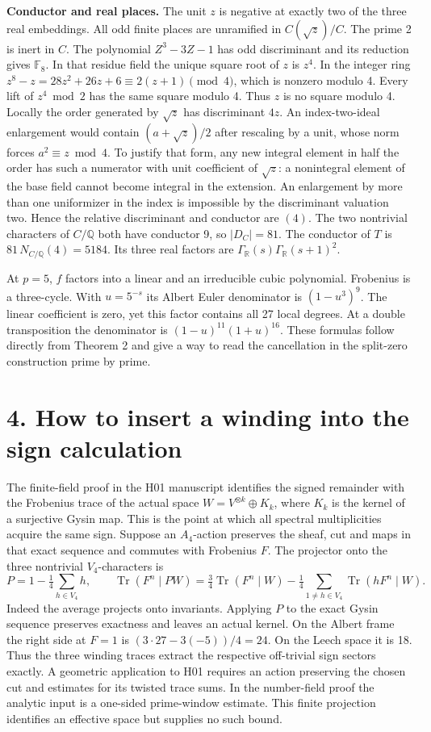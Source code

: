 \documentclass[11pt,a4paper]{article}
\newcommand{\Q}{\mathbb Q}
\newcommand{\Tr}{\operatorname{Tr}}
\begin{document}
\textbf{Conductor and real places.} The unit $z$ is negative at exactly two of the three real embeddings.
All odd finite places are unramified in $C(\sqrt z)/C$. The prime 2 is inert in $C$. The polynomial
$Z^3-3Z-1$ has odd discriminant and its reduction gives $\mathbb F_8$. In that residue field the unique square
root of $z$ is $z^4$. In the integer ring $z^8-z=28z^2+26z+6\equiv2(z+1)\pmod4$, which is nonzero modulo 4.
Every lift of $z^4\bmod2$ has the same square modulo 4. Thus $z$ is no square modulo 4. Locally the order
generated by $\sqrt z$ has discriminant $4z$. An index-two-ideal enlargement would contain
$(a+\sqrt z)/2$ after rescaling by a unit, whose norm forces $a^2\equiv z\bmod4$. To justify that form, any
new integral element in half the order has such a numerator with unit coefficient of $\sqrt z$: a nonintegral
element of the base field cannot become integral in the extension. An enlargement by more than one uniformizer
in the index is impossible by the discriminant valuation two. Hence the relative discriminant and conductor are
$(4)$. The two nontrivial characters of $C/\Q$ both have conductor 9, so $|D_C|=81$. The conductor of $T$ is
$81\,N_{C/\Q}(4)=5184$. Its three real factors are $\Gamma_{\mathbb R}(s)\Gamma_{\mathbb R}(s+1)^2$.

At $p=5$, $f$ factors into a linear and an irreducible cubic polynomial. Frobenius is a three-cycle.
With $u=5^{-s}$ its Albert Euler denominator is $(1-u^3)^9$. The linear coefficient is zero, yet this factor
contains all 27 local degrees. At a double transposition the denominator is
$(1-u)^{11}(1+u)^{16}$. These formulas follow directly from Theorem 2 and give a way to read the cancellation
in the split-zero construction prime by prime.

\newpage
\section*{4. How to insert a winding into the sign calculation}
The finite-field proof in the H01 manuscript identifies the signed remainder with the Frobenius trace of the
actual space $W=V^{\otimes k}\oplus K_k$, where $K_k$ is the kernel of a surjective Gysin map. This is the
point at which all spectral multiplicities acquire the same sign. Suppose an $A_4$-action preserves the sheaf,
cut and maps in that exact sequence and commutes with Frobenius $F$. The projector onto the three nontrivial
$V_4$-characters is
\[
 P=1-\tfrac14\sum_{h\in V_4}h,\qquad
 \Tr(F^n\mid PW)=\tfrac34\Tr(F^n\mid W)
                  -\tfrac14\sum_{1\ne h\in V_4}\Tr(hF^n\mid W).
\]
Indeed the average projects onto invariants. Applying $P$ to the exact Gysin sequence preserves exactness and
leaves an actual kernel. On the Albert frame the right side at $F=1$ is $(3\cdot27-3(-5))/4=24$. On the
Leech space it is 18. Thus the three winding traces extract the respective off-trivial sign sectors exactly.
A geometric application to H01 requires an action preserving the chosen cut and estimates for its twisted
trace sums. In the number-field proof the analytic input is a one-sided prime-window estimate. This finite
projection identifies an effective space but supplies no such bound.
\end{document}
